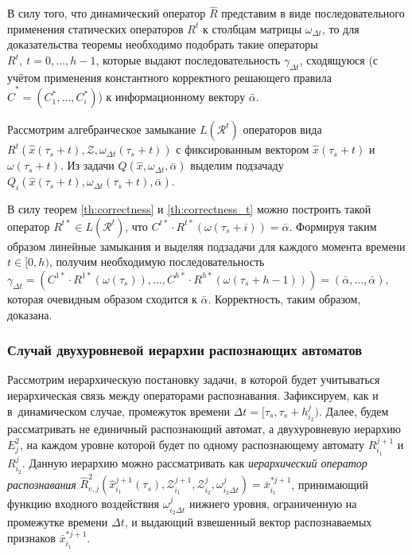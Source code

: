 \begin{Proof}
	В силу того, что динамический оператор $\hat{R}$ представим в виде последовательного применения статических операторов $R^t$ к столбцам матрицы $\omega_{\Delta{t}}$, то для доказательства теоремы необходимо подобрать такие операторы $R^t,\ t=0,\dots,h-1$, которые выдают последовательность $\gamma_{\Delta{t}}$, сходящуюся (с учётом применения константного корректного решающего правила $\hat{C}^*=(C_1^*,\dots,C_i^*)$) к информационному вектору $\bar{\alpha}$.
	
	Рассмотрим алгебраическое замыкание $L(\mathcal R^t)$ операторов вида $R^t(\hat{x}(\tau_s+t), \mathcal Z, \omega_{\Delta t}(\tau_s+t))$ с фиксированным вектором $\hat{x}(\tau_s+t)$ и $\omega(\tau_s+t)$. Из задачи $\hat{Q}(\hat{x}, \omega_{{\Delta}t}, \bar{\alpha})$ выделим подзачаду $Q_i(\hat x(\tau_s+t), \omega_{\Delta t}(\tau_s+t),\bar\alpha)$. 

	В силу теорем \ref{th:correctness} и \ref{th:correctness_t} можно построить такой оператор $R^{t*}\in L(\mathcal R^t)$, что $C^{t*}\cdot R^{t*}(\omega(\tau_s+i))=\bar{\alpha}$. Формируя таким образом линейные замыкания и выделяя подзадачи для каждого момента времени $t\in[0,h)$, получим необходимую последовательность $\gamma_{\Delta t}=(C^{1*}\cdot R^{1*}(\omega(\tau_s)), \dots, C^{h*}\cdot R^{h*}(\omega(\tau_s+h-1)))=(\bar{\alpha},\dots,\bar{\alpha})$, которая очевидным образом сходится к $\bar{\alpha}$. Корректность, таким образом, доказана.		
\end{Proof}
	
\subsubsection{Случай двухуровневой иерархии распознающих автоматов}

Рассмотрим иерархическую постановку задачи, в которой будет учитываться иерархическая связь между операторами распознавания. Зафиксируем, как и в~динамическом случае, промежуток времени $\Delta t=[\tau_s,\tau_s+h_{i_2}^j)$. Далее, будем рассматривать не единичный распознающий автомат, а двухуровневую иерархию $E_j^2$, на каждом уровне которой будет по одному распознающему автомату $R_{i_1}^{j+1}$ и $R_{i_2}^j$. Данную иерархию можно рассматривать как \textit{иерархический оператор распознавания} $\hat R_{e,j}^2(\hat x_{i_1}^{j+1}(\tau_s),\mathcal Z_{i_1}^{j+1},\mathcal Z_{i_2}^j,\omega_{i_2\Delta t}^j)=\bar x_{i_1}^{*j+1}$, принимающий функцию входного воздействия $\omega_{i_2\Delta t}^j$ нижнего уровня, ограниченную на промежутке времени $\Delta t$, и выдающий взвешенный вектор распознаваемых признаков $\bar x_{i_1}^{*j+1}$. 

